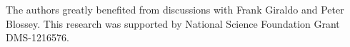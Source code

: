 \documentclass{ametsoc}
\begin{document}
%
\acknowledgments
The authors greatly benefited from discussions with Frank Giraldo and Peter Blossey.  This research was supported by National Science Foundation Grant DMS-1216576.

%
\appendix


 \label{apx:proof}
\end{document}
